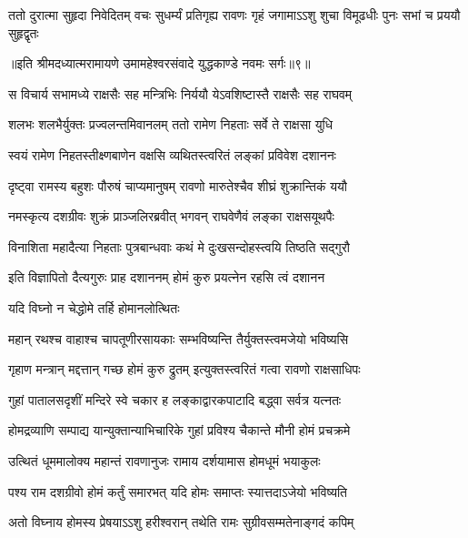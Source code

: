 \fourlineindentedshloka
{ततो दुरात्मा सुहृदा निवेदितम्}
{वचः सुधर्म्यं प्रतिगृह्य रावणः}
{गृहं जगामाऽऽशु शुचा विमूढधीः}
{पुनः सभां च प्रययौ सुहृद्वृतः} %

{॥इति श्रीमदध्यात्मरामायणे उमामहेश्वरसंवादे युद्धकाण्डे नवमः
सर्गः॥९॥
}





\twolineshloka
{स विचार्य सभामध्ये राक्षसैः सह मन्त्रिभिः}
{निर्ययौ येऽवशिष्टास्तै राक्षसैः सह राघवम्} %

\twolineshloka
{शलभः शलभैर्युक्तः प्रज्वलन्तमिवानलम्}
{ततो रामेण निहताः सर्वे ते राक्षसा युधि} %

\twolineshloka
{स्वयं रामेण निहतस्तीक्ष्णबाणेन वक्षसि}
{व्यथितस्त्वरितं लङ्कां प्रविवेश दशाननः} %

\twolineshloka
{दृष्ट्वा रामस्य बहुशः पौरुषं चाप्यमानुषम्}
{रावणो मारुतेश्चैव शीघ्रं शुक्रान्तिकं ययौ} %

\twolineshloka
{नमस्कृत्य दशग्रीवः शुक्रं प्राञ्जलिरब्रवीत्}
{भगवन् राघवेणैवं लङ्का राक्षसयूथपैः} %

\twolineshloka
{विनाशिता महादैत्या निहताः पुत्रबान्धवाः}
{कथं मे दुःखसन्दोहस्त्वयि तिष्ठति सद्गुरौ} %

\twolineshloka
{इति विज्ञापितो दैत्यगुरुः प्राह दशाननम्}
{होमं कुरु प्रयत्नेन रहसि त्वं दशानन} %

{यदि विघ्नो न चेद्धोमे तर्हि होमानलोत्थितः} %


\twolineshloka
{महान् रथश्च वाहाश्च चापतूणीरसायकाः}
{सम्भविष्यन्ति तैर्युक्तस्त्वमजेयो भविष्यसि} %

\twolineshloka
{गृहाण मन्त्रान् मद्दत्तान् गच्छ होमं कुरु द्रुतम्}
{इत्युक्तस्त्वरितं गत्वा रावणो राक्षसाधिपः} %

\twolineshloka
{गुहां पातालसदृशीं मन्दिरे स्वे चकार ह}
{लङ्काद्वारकपाटादि बद्ध्वा सर्वत्र यत्नतः} %

\twolineshloka
{होमद्रव्याणि सम्पाद्य यान्युक्तान्याभिचारिके}
{गुहां प्रविश्य चैकान्ते मौनी होमं प्रचक्रमे} %

\twolineshloka
{उत्थितं धूममालोक्य महान्तं रावणानुजः}
{रामाय दर्शयामास होमधूमं भयाकुलः} %

\twolineshloka
{पश्य राम दशग्रीवो होमं कर्तुं समारभत्}
{यदि होमः समाप्तः स्यात्तदाऽजेयो भविष्यति} %

\twolineshloka
{अतो विघ्नाय होमस्य प्रेषयाऽऽशु हरीश्वरान्}
{तथेति रामः सुग्रीवसम्मतेनाङ्गदं कपिम्} %


